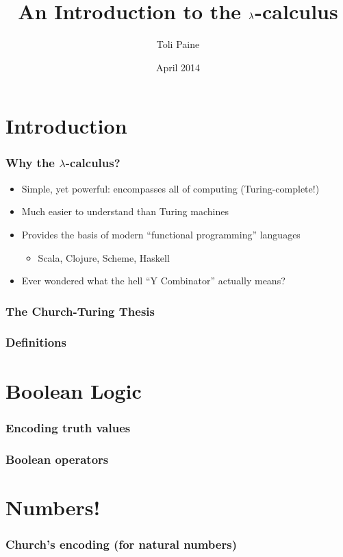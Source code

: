 \documentclass{beamer}
\title{An Introduction to the $\l$-calculus}
\author{Toli Paine}
\institute{Quantcast}
\date{April 2014}
\renewcommand{\l}{\lambda} %
\begin{document}
    \frame{\titlepage}

    \section{Introduction}
    \begin{frame}
        \frametitle{Why the $\l$-calculus?}
        \pause
        \begin{itemize}[<+->]
            \setlength{\itemsep}{1.5em}
            \item Simple, yet powerful: encompasses all of computing
                (Turing-complete!)
            \item Much easier to understand than Turing machines
            \item Provides the basis of modern ``functional programming''
                languages \\[0.25em]
                \begin{itemize}[<+->]
                    \item Scala, Clojure, Scheme, Haskell
                \end{itemize}
                \vspace{-0.5em}
            \item Ever wondered what the hell ``Y Combinator'' actually means?
        \end{itemize}
    \end{frame}
    \begin{frame}
        \frametitle{The Church-Turing Thesis}
    \end{frame}
    \begin{frame}
        \frametitle{Definitions}
    \end{frame}

    \section{Boolean Logic}
    \begin{frame}
        \frametitle{Encoding truth values}
    \end{frame}
    \begin{frame}
        \frametitle{Boolean operators}
    \end{frame}

    \section{Numbers!}
    \begin{frame}
        \frametitle{Church's encoding (for natural numbers)}
    \end{frame}
\end{document}
